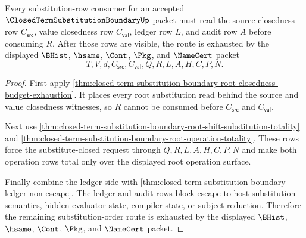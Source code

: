 \begin{theorem}
\label{thm:closed-term-substitution-boundary-substitution-order-exhaustion}
Every substitution-row consumer for an accepted $\ClosedTermSubstitutionBoundaryUp$ packet must read the source closedness row $C_{\mathsf{src}}$, value closedness row $C_{\mathsf{val}}$, ledger row $L$, and audit row $A$ before consuming $R$. After those rows are visible, the route is exhausted by the displayed $\BHist$, $\hsame$, $\Cont$, $\Pkg$, and $\NameCert$ packet
$$
T,V,d,C_{\mathsf{src}},C_{\mathsf{val}},Q,R,L,A,H,C,P,N.
$$
\end{theorem}
\begin{proof}
First apply \autoref{thm:closed-term-substitution-boundary-root-closedness-budget-exhaustion}. It places every root substitution read behind the source and value closedness witnesses, so $R$ cannot be consumed before $C_{\mathsf{src}}$ and $C_{\mathsf{val}}$.

Next use \autoref{thm:closed-term-substitution-boundary-root-shift-substitution-totality} and \autoref{thm:closed-term-substitution-boundary-root-operation-totality}. These rows force the substitute-closed request through $Q,R,L,A,H,C,P,N$ and make both operation rows total only over the displayed root operation surface.

Finally combine the ledger side with \autoref{thm:closed-term-substitution-boundary-ledger-non-escape}. The ledger and audit rows block escape to host substitution semantics, hidden evaluator state, compiler state, or subject reduction. Therefore the remaining substitution-order route is exhausted by the displayed $\BHist$, $\hsame$, $\Cont$, $\Pkg$, and $\NameCert$ packet.
\end{proof}

